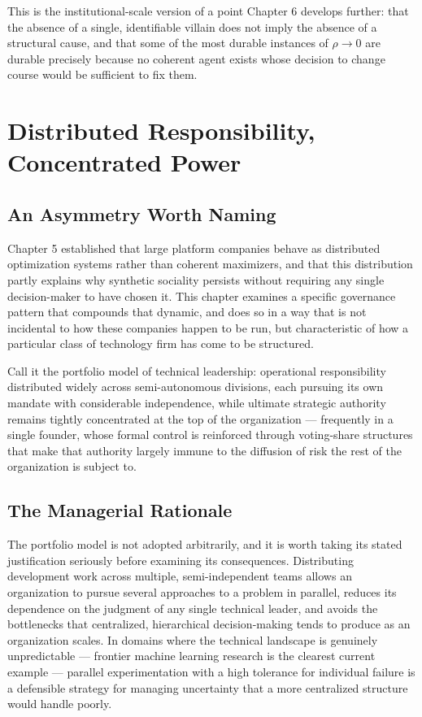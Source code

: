 \documentclass[12pt,a4paper]{book}
\begin{document}
This is the institutional-scale version of a point Chapter 6 develops further: that the absence of a single, identifiable villain does not imply the absence of a structural cause, and that some of the most durable instances of $\rho \to 0$ are durable precisely because no coherent agent exists whose decision to change course would be sufficient to fix them.


\chapter{Distributed Responsibility, Concentrated Power}

\section{An Asymmetry Worth Naming}

Chapter 5 established that large platform companies behave as distributed optimization systems rather than coherent maximizers, and that this distribution partly explains why synthetic sociality persists without requiring any single decision-maker to have chosen it. This chapter examines a specific governance pattern that compounds that dynamic, and does so in a way that is not incidental to how these companies happen to be run, but characteristic of how a particular class of technology firm has come to be structured.

Call it the portfolio model of technical leadership: operational responsibility distributed widely across semi-autonomous divisions, each pursuing its own mandate with considerable independence, while ultimate strategic authority remains tightly concentrated at the top of the organization — frequently in a single founder, whose formal control is reinforced through voting-share structures that make that authority largely immune to the diffusion of risk the rest of the organization is subject to.

\section{The Managerial Rationale}

The portfolio model is not adopted arbitrarily, and it is worth taking its stated justification seriously before examining its consequences. Distributing development work across multiple, semi-independent teams allows an organization to pursue several approaches to a problem in parallel, reduces its dependence on the judgment of any single technical leader, and avoids the bottlenecks that centralized, hierarchical decision-making tends to produce as an organization scales. In domains where the technical landscape is genuinely unpredictable — frontier machine learning research is the clearest current example — parallel experimentation with a high tolerance for individual failure is a defensible strategy for managing uncertainty that a more centralized structure would handle poorly.
\end{document}
